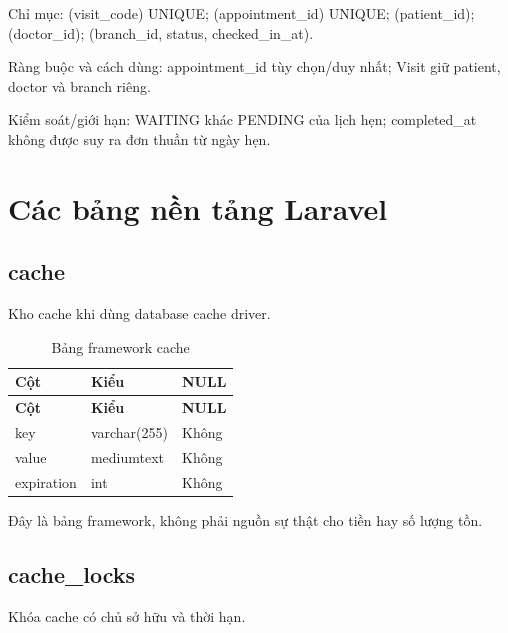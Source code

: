 Chỉ mục:\allowbreak{} (visit\_\allowbreak{}code) UNIQUE; (appointment\_\allowbreak{}id) UNIQUE; (patient\_\allowbreak{}id); (doctor\_\allowbreak{}id); (branch\_\allowbreak{}id, status, checked\_\allowbreak{}in\_\allowbreak{}at).\allowbreak{}

Ràng buộc và cách dùng:\allowbreak{} appointment\_\allowbreak{}id tùy chọn/\allowbreak{}duy nhất; Visit giữ patient, doctor và branch riêng.\allowbreak{}

Kiểm soát/\allowbreak{}giới hạn:\allowbreak{} WAITING khác PENDING của lịch hẹn; completed\_\allowbreak{}at không được suy ra đơn thuần từ ngày hẹn.\allowbreak{}

\endgroup
\clearpage

\section{Các bảng nền tảng Laravel}

\subsection{cache}
Kho cache khi dùng database cache driver.\allowbreak{}


{\fontsize{10}{12}\selectfont\setlength{\tabcolsep}{3pt}\renewcommand{\arraystretch}{1.12}
\begin{longtable}{@{}L{\textwidth-5.28pt\relax} L{\textwidth-4.8pt\relax} L{\textwidth-1.92pt\relax}@{}}
\caption{Bảng framework cache}\\
\toprule
\textbf{Cột} & \textbf{Kiểu} & \textbf{NULL}\\\midrule
\endfirsthead
\toprule
\textbf{Cột} & \textbf{Kiểu} & \textbf{NULL}\\\midrule
\endhead
\bottomrule\endlastfoot
key & varchar(255) & Không\\[1pt]
value & mediumtext & Không\\[1pt]
expiration & int & Không\\[1pt]
\end{longtable}}
{\small Đây là bảng framework, không phải nguồn sự thật cho tiền hay số lượng tồn.\allowbreak{}

}

\subsection{cache\_\allowbreak{}locks}
Khóa cache có chủ sở hữu và thời hạn.\allowbreak{}



